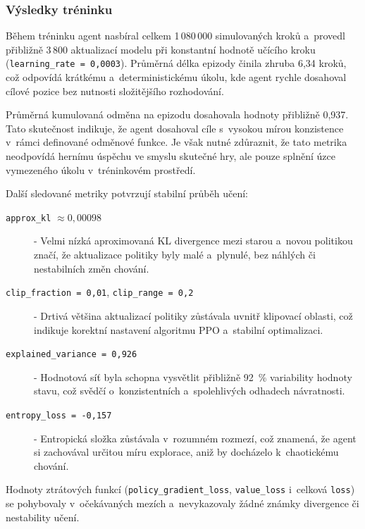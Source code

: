 \subsubsection{Výsledky tréninku}

Během tréninku agent nasbíral celkem 1\,080\,000 simulovaných kroků a~provedl přibližně 3\,800 aktualizací modelu při konstantní hodnotě učícího kroku (\texttt{learning\_rate = 0{,}0003}). Průměrná délka epizody činila zhruba 6{,}34 kroků, což odpovídá krátkému a~deterministickému úkolu, kde agent rychle dosahoval cílové pozice bez nutnosti složitějšího rozhodování.

Průměrná kumulovaná odměna na epizodu dosahovala hodnoty přibližně 0{,}937. Tato skutečnost indikuje, že agent dosahoval cíle s~vysokou mírou konzistence v~rámci definované odměnové funkce. Je však nutné zdůraznit, že tato metrika neodpovídá hernímu úspěchu ve smyslu skutečné hry, ale pouze splnění úzce vymezeného úkolu v~tréninkovém prostředí.

Další sledované metriky potvrzují stabilní průběh učení:

\begin{description}
    \item[\texttt{approx\_kl} $\approx 0{,}00098$] - Velmi nízká aproximovaná KL divergence mezi starou a~novou politikou značí, že aktualizace politiky byly malé a~plynulé, bez náhlých či nestabilních změn chování.
    
    \item[\texttt{clip\_fraction = 0{,}01}, \texttt{clip\_range = 0{,}2}] - Drtivá většina aktualizací politiky zůstávala uvnitř klipovací oblasti, což indikuje korektní nastavení algoritmu PPO a~stabilní optimalizaci.
    
    \item[\texttt{explained\_variance = 0{,}926}] - Hodnotová síť byla schopna vysvětlit přibližně 92~\% variability hodnoty stavu, což svědčí o~konzistentních a~spolehlivých odhadech návratnosti.
    
    \item[\texttt{entropy\_loss = -0{,}157}] - Entropická složka zůstávala v~rozumném rozmezí, což znamená, že agent si zachovával určitou míru explorace, aniž by docházelo k~chaotickému chování.
\end{description}

Hodnoty ztrátových funkcí (\texttt{policy\_gradient\_loss}, \texttt{value\_loss} i~celková \texttt{loss}) se pohybovaly v~očekávaných mezích a~nevykazovaly žádné známky divergence či nestability učení.


